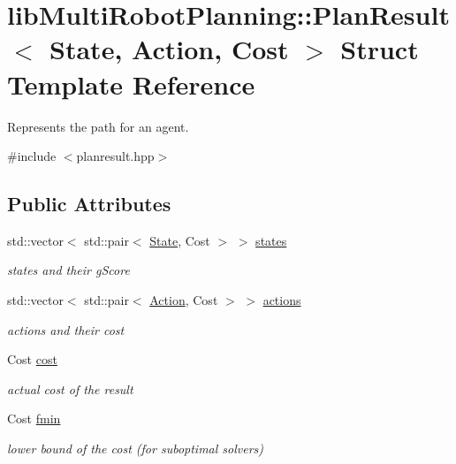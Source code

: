 \hypertarget{structlib_multi_robot_planning_1_1_plan_result}{}\section{lib\+Multi\+Robot\+Planning\+:\+:Plan\+Result$<$ State, Action, Cost $>$ Struct Template Reference}
\label{structlib_multi_robot_planning_1_1_plan_result}


Represents the path for an agent.  




{\ttfamily \#include $<$planresult.\+hpp$>$}

\subsection*{Public Attributes}
\begin{DoxyCompactItemize}
\item 
std\+::vector$<$ std\+::pair$<$ \hyperlink{structlib_multi_robot_planning_1_1_state}{State}, Cost $>$ $>$ \hyperlink{structlib_multi_robot_planning_1_1_plan_result_ad1bd2882efca968d38165742bae0a511}{states}
\begin{DoxyCompactList}\small\item\em states and their g\+Score \end{DoxyCompactList}\item 
std\+::vector$<$ std\+::pair$<$ \hyperlink{namespacelib_multi_robot_planning_aba73fb71693f86a324adfa0e41e1053d}{Action}, Cost $>$ $>$ \hyperlink{structlib_multi_robot_planning_1_1_plan_result_aa868b92b5c742f6c662e69779fbd09a4}{actions}
\begin{DoxyCompactList}\small\item\em actions and their cost \end{DoxyCompactList}\item 
Cost \hyperlink{structlib_multi_robot_planning_1_1_plan_result_ab340aeae4fdabbd0345403e9fa609d9a}{cost}
\begin{DoxyCompactList}\small\item\em actual cost of the result \end{DoxyCompactList}\item 
Cost \hyperlink{structlib_multi_robot_planning_1_1_plan_result_aefdd2f68b906f207ded16bfe46e0f7b0}{fmin}
\begin{DoxyCompactList}\small\item\em lower bound of the cost (for suboptimal solvers) \end{DoxyCompactList}\end{DoxyCompactItemize}


